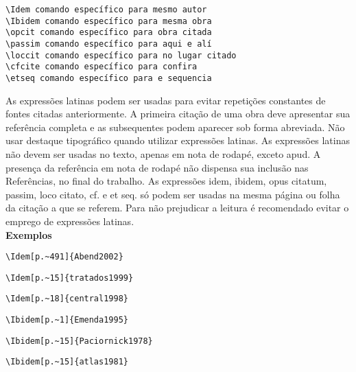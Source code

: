 \begin{alineas}
\item
\begin{verbatim}
\Idem comando específico para mesmo autor
\Ibidem comando específico para mesma obra
\opcit comando específico para obra citada
\passim comando específico para aqui e alí
\loccit comando específico para no lugar citado
\cfcite comando específico para confira
\etseq comando específico para e sequencia 
\end{verbatim} 

As expressões latinas podem ser usadas para evitar repetições constantes de fontes citadas anteriormente. A primeira citação de uma obra deve apresentar sua refer\^encia completa e as subsequentes podem aparecer sob forma abreviada. Não usar destaque tipogr\'afico quando utilizar expressões latinas. As expressões latinas não devem ser usadas no texto, apenas em nota de rodap\'e, exceto apud. A presença da refer\^encia em nota de rodap\'e não dispensa sua inclusão nas Refer\^encias, no final do trabalho. As expressões idem, ibidem, opus citatum, passim, loco citato, cf. e et seq. só podem ser usadas na mesma p\'agina ou folha da citação a que se referem. Para não prejudicar a leitura \'e recomendado evitar o emprego de expressões latinas.\\

\textbf{Exemplos}

\begin{verbatim}
\Idem[p.~491]{Abend2002}
\end{verbatim}

\begin{verbatim}
\Idem[p.~15]{tratados1999}
\end{verbatim}

\begin{verbatim}
\Idem[p.~18]{central1998}
\end{verbatim}

\begin{verbatim}
\Ibidem[p.~1]{Emenda1995}
\end{verbatim}

\begin{verbatim}
\Ibidem[p.~15]{Paciornick1978}
\end{verbatim}

\begin{verbatim}
\Ibidem[p.~15]{atlas1981}
\end{verbatim}


\end{alineas}
